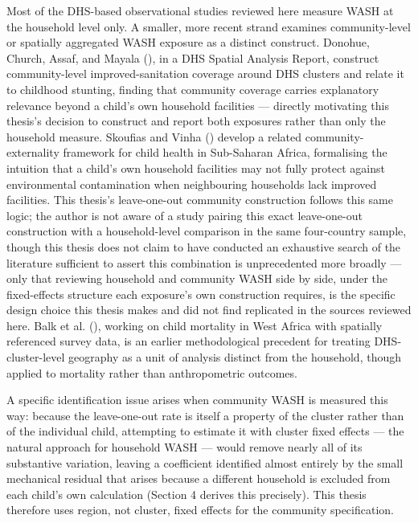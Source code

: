 Most of the DHS-based observational studies reviewed here measure WASH at the household level only. A smaller, more recent strand examines community-level or spatially aggregated WASH exposure as a distinct construct. Donohue, Church, Assaf, and Mayala (\citeyear{Donohue2023}), in a DHS Spatial Analysis Report, construct community-level improved-sanitation coverage around DHS clusters and relate it to childhood stunting, finding that community coverage carries explanatory relevance beyond a child's own household facilities --- directly motivating this thesis's decision to construct and report both exposures rather than only the household measure. Skoufias and Vinha (\citeyear{SkoufiasVinha2026}) develop a related community-externality framework for child health in Sub-Saharan Africa, formalising the intuition that a child's own household facilities may not fully protect against environmental contamination when neighbouring households lack improved facilities. This thesis's leave-one-out community construction follows this same logic; the author is not aware of a study pairing this exact leave-one-out construction with a household-level comparison in the same four-country sample, though this thesis does not claim to have conducted an exhaustive search of the literature sufficient to assert this combination is unprecedented more broadly --- only that reviewing household and community WASH side by side, under the fixed-effects structure each exposure's own construction requires, is the specific design choice this thesis makes and did not find replicated in the sources reviewed here. Balk et al. (\citeyear{Balk2004}), working on child mortality in West Africa with spatially referenced survey data, is an earlier methodological precedent for treating DHS-cluster-level geography as a unit of analysis distinct from the household, though applied to mortality rather than anthropometric outcomes.

A specific identification issue arises when community WASH is measured this way: because the leave-one-out rate is itself a property of the cluster rather than of the individual child, attempting to estimate it with cluster fixed effects --- the natural approach for household WASH --- would remove nearly all of its substantive variation, leaving a coefficient identified almost entirely by the small mechanical residual that arises because a different household is excluded from each child's own calculation (Section 4 derives this precisely). This thesis therefore uses region, not cluster, fixed effects for the community specification.

